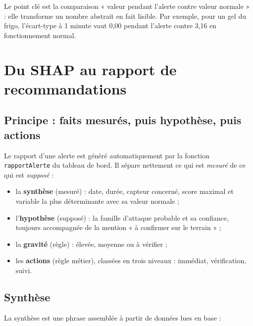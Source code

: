 Le point clé est la comparaison « valeur pendant l'alerte contre valeur
normale » : elle transforme un nombre abstrait en fait lisible. Par exemple,
pour un gel du frigo, l'écart-type à 1 minute vaut 0,00 pendant l'alerte contre
3,16 en fonctionnement normal.


\section{Du SHAP au rapport de recommandations}
\label{sec:expl_rapport}

\subsection{Principe : faits mesurés, puis hypothèse, puis actions}

Le rapport d'une alerte est généré automatiquement par la fonction
\texttt{rapportAlerte} du tableau de bord. Il sépare nettement ce qui est
\emph{mesuré} de ce qui est \emph{supposé} :

\begin{itemize}
  \item la \textbf{synthèse} (mesuré) : date, durée, capteur concerné, score
        maximal et variable la plus déterminante avec sa valeur normale ;
  \item l'\textbf{hypothèse} (supposé) : la famille d'attaque probable et sa
        confiance, toujours accompagnée de la mention « à confirmer sur le
        terrain » ;
  \item la \textbf{gravité} (règle) : élevée, moyenne ou à vérifier ;
  \item les \textbf{actions} (règle métier), classées en trois niveaux :
        immédiat, vérification, suivi.
\end{itemize}

\subsection{Synthèse}

La synthèse est une phrase assemblée à partir de données lues en base :

